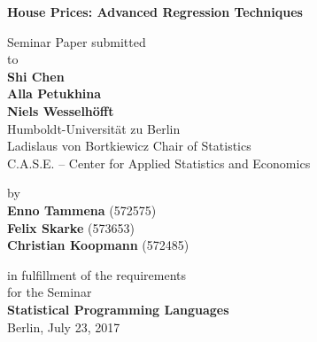 \begin{center}

    {\Large{\bf House Prices: Advanced Regression Techniques}} \vspace{0.5cm}


    {\normalsize Seminar Paper submitted\\\vspace{0.5cm}
    to}\\\vspace{0.5cm}
    {\normalsize{\bf Shi Chen \\Alla Petukhina \\Niels Wesselh\"offt}} \\\vspace{0.5cm}
    {\normalsize Humboldt-Universit\"at zu Berlin \\
    Ladislaus von Bortkiewicz Chair of Statistics \\
    C.A.S.E. – Center for Applied Statistics
and Economics} \vspace{1cm}


    {\normalsize by \\\vspace{0.5cm}
    {\bf Enno Tammena}
    (572575)}\\
    {\normalsize
    {\bf Felix Skarke}
    (573653)}\\
    {\normalsize
    {\bf Christian Koopmann}
    (572485)}\vspace{1cm}


    {\normalsize in fulfillment of the requirements  \\
    for the Seminar \\
    {\bf Statistical Programming Languages} \\
    Berlin, July 23, 2017}

\end{center}
